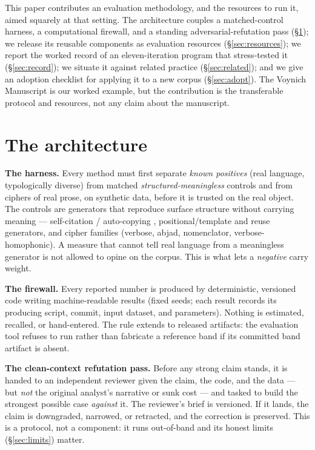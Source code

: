 \documentclass[11pt]{article}
\begin{document}
This paper contributes an evaluation methodology, and the resources to run it, aimed squarely at
that setting. The architecture couples a matched-control harness, a computational firewall, and a
standing adversarial-refutation pass (\S\ref{sec:arch}); we release its reusable components as
evaluation resources (\S\ref{sec:resources}); we report the worked record of an eleven-iteration
program that stress-tested it (\S\ref{sec:record}); we situate it against related practice
(\S\ref{sec:related}); and we give an adoption checklist for applying it to a new corpus
(\S\ref{sec:adopt}). The Voynich Manuscript is our worked example, but the contribution is the
transferable protocol and resources, not any claim about the manuscript.

\section{The architecture}
\label{sec:arch}
\textbf{The harness.} Every method must first separate \emph{known positives} (real language,
typologically diverse) from matched \emph{structured-meaningless} controls and from ciphers of
real prose, on synthetic data, before it is trusted on the real object. The controls are
generators that reproduce surface structure without carrying meaning --- self-citation /
auto-copying \citep{timm2020selfcitation}, positional/template and reuse generators, and cipher families (verbose, abjad,
nomenclator, verbose-homophonic). A measure that cannot tell real language from a meaningless
generator is not allowed to opine on the corpus. This is what lets a \emph{negative} carry weight.

\textbf{The firewall.} Every reported number is produced by deterministic, versioned code writing
machine-readable results (fixed seeds; each result records its producing script, commit, input
dataset, and parameters). Nothing is estimated, recalled, or hand-entered. The rule extends to
released artifacts: the evaluation tool refuses to run rather than fabricate a reference band if
its committed band artifact is absent.

\textbf{The clean-context refutation pass.} Before any strong claim stands, it is handed to an
independent reviewer given the claim, the code, and the data --- but \emph{not} the original
analyst's narrative or sunk cost --- and tasked to build the strongest possible case
\emph{against} it. The reviewer's brief is versioned. If it lands, the claim is downgraded,
narrowed, or retracted, and the correction is preserved. This is a protocol, not a component: it
runs out-of-band and its honest limits (\S\ref{sec:limits}) matter.
\end{document}
